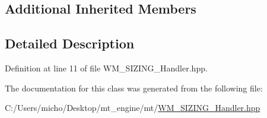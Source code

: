 \subsection*{Additional Inherited Members}


\subsection{Detailed Description}


Definition at line 11 of file W\+M\+\_\+\+S\+I\+Z\+I\+N\+G\+\_\+\+Handler.\+hpp.



The documentation for this class was generated from the following file\+:\begin{DoxyCompactItemize}
\item 
C\+:/\+Users/micho/\+Desktop/mt\+\_\+engine/mt/\hyperlink{_w_m___s_i_z_i_n_g___handler_8hpp}{W\+M\+\_\+\+S\+I\+Z\+I\+N\+G\+\_\+\+Handler.\+hpp}\end{DoxyCompactItemize}
